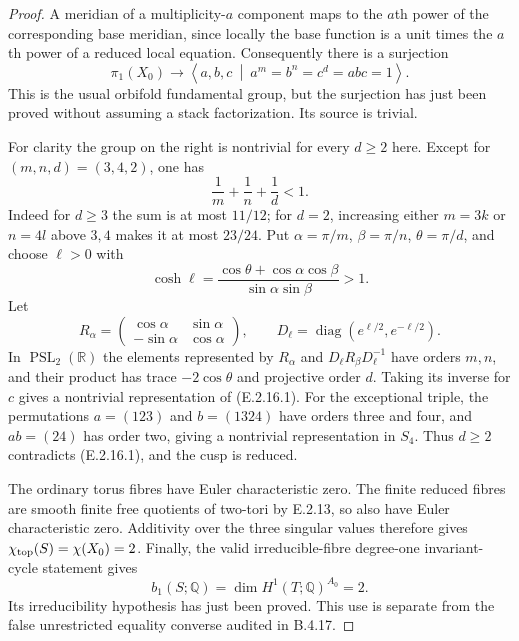 \begin{proof}
A meridian of a multiplicity-$a$ component
maps to the $a$th power of the corresponding
base meridian, since locally the base
function is a unit times the $a$th power
of a reduced local equation.  Consequently
there is a surjection
\[
 \pi_1(X_0)\longrightarrow
 \left\langle a,b,c\ \middle|\
 a^m=b^n=c^d=abc=1\right\rangle.
 \tag{E.2.16.1}
\]
This is the usual orbifold fundamental
group, but the surjection has just been
proved without assuming a stack
factorization.  Its source is trivial.

For clarity the group on the right is
nontrivial for every $d\ge2$ here.
Except for $(m,n,d)=(3,4,2)$, one has
\[
 \frac1m+\frac1n+\frac1d<1.
\]
Indeed for $d\ge3$ the sum is at most
$11/12$; for $d=2$, increasing either
$m=3k$ or $n=4l$ above $3,4$ makes it
at most $23/24$.  Put
$\alpha=\pi/m$, $\beta=\pi/n$,
$\theta=\pi/d$, and choose $\ell>0$ with
\[
 \cosh\ell=
 \frac{\cos\theta+\cos\alpha\cos\beta}
      {\sin\alpha\sin\beta}>1.
\]
Let
\[
 R_\alpha=\begin{pmatrix}
 \cos\alpha&\sin\alpha\\
 -\sin\alpha&\cos\alpha
 \end{pmatrix},\qquad
 D_\ell=\operatorname{diag}(e^{\ell/2},e^{-\ell/2}).
\]
In $\operatorname{PSL}_2(\mathbb R)$ the
elements represented by $R_\alpha$ and
$D_\ell R_\beta D_\ell^{-1}$ have orders
$m,n$, and their product has trace
$-2\cos\theta$ and projective order $d$.
Taking its inverse for $c$ gives a
nontrivial representation of (E.2.16.1).
For the exceptional triple, the
permutations $a=(123)$ and $b=(1324)$
have orders three and four, and
$ab=(24)$ has order two, giving a
nontrivial representation in $S_4$.
Thus $d\ge2$ contradicts (E.2.16.1),
and the cusp is reduced.

The ordinary torus fibres have Euler
characteristic zero.  The finite reduced
fibres are smooth finite free quotients
of two-tori by E.2.13, so also have
Euler characteristic zero.  Additivity
over the three singular values therefore
gives $\chi_{\rm top}(S)=\chi(X_0)=2$.
Finally, the valid irreducible-fibre
degree-one invariant-cycle statement
\cite[Corollary 3.7, arXiv version~1]{HondaViaclovsky2025D}
gives
\[
 b_1(S;\mathbb Q)=
 \dim H^1(T;\mathbb Q)^{A_0}=2.
\]
Its irreducibility hypothesis has just
been proved.  This use is separate from
the false unrestricted equality
converse audited in B.4.17.
\end{proof}
